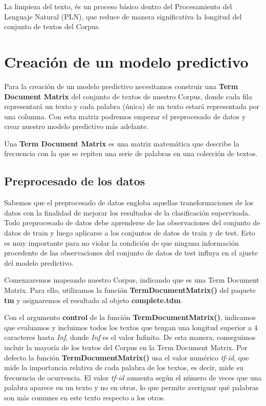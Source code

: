 \documentclass[]{article}
\begin{document}
La limpieza del texto, és un proceso básico dentro del Procesamiento del Lenguaje Natural (PLN), que reduce de manera significativa la longitud del conjunto de textos del Corpus. 

\hypertarget{creaciuxf3n-de-un-modelo-predictivo}{%
\section{Creación de un modelo
predictivo}\label{creaciuxf3n-de-un-modelo-predictivo}}

Para la creación de un modelo predictivo necesitamos construir una \textbf{Term Document Matrix} del conjunto de textos de nuestro Corpus, donde cada fila representará un texto y cada palabra (única) de un texto estará representada por una columna. Con esta matriz podremos empezar el preprocesado de datos y crear nuestro modelo predictivo más adelante.

\begin{tcolorbox}
	Una \textbf{Term Document Matrix} es una matriz matemática que describe la
	frecuencia con la que se repiten una serie de palabras en una colección
	de textos.
\end{tcolorbox}

\hypertarget{preprocesado-de-los-datos}{%
\subsection{Preprocesado de los datos}\label{preprocesado-de-los-datos}}

Sabemos que el preprocesado de datos engloba aquellas transformaciones de los datos con la finalidad de mejorar los resultados de la clasificación supervisada. Todo preprocesado de datos debe
aprenderse de las observaciones del conjunto de datos de train y luego aplicarse a los conjuntos de datos de train y de test. Esto es muy importante para no violar la condición
de que ninguna información procedente de las observaciones del conjunto de datos de test
influya en el ajuste del modelo predictivo.

Comenzaremos mapeando nuestro Corpus, indicando que es una Term
Document Matrix. Para ello, utilizamos la función \textbf{TermDocumentMatrix()} del paquete \textbf{tm} y
asignaremos el resultado al objeto \textbf{complete.tdm}. 

Con el argumento \textbf{control} de la función \textbf{TermDocumentMatrix()}, indicamos que evaluamos y incluimos todos los textos que tengan una longitud superior a 4 caracteres hasta \emph{Inf}, donde \emph{Inf} es el valor Infinito. De esta manera, conseguimos incluir la mayoría de los textos  del Corpus en la Term Document Matrix. Por defecto la función \textbf{TermDocumentMatrix()} usa el valor numérico \emph{tf-id}, que mide la importancia relativa de cada palabra de los textos, es decir, mide su frecuencia de ocurrencia. El valor \emph{tf-id} aumenta según el número de veces que una palabra aparece en un texto y no en otros, lo que permite averiguar qué palabras son más comunes en este texto respecto a los otros.
\end{document}
